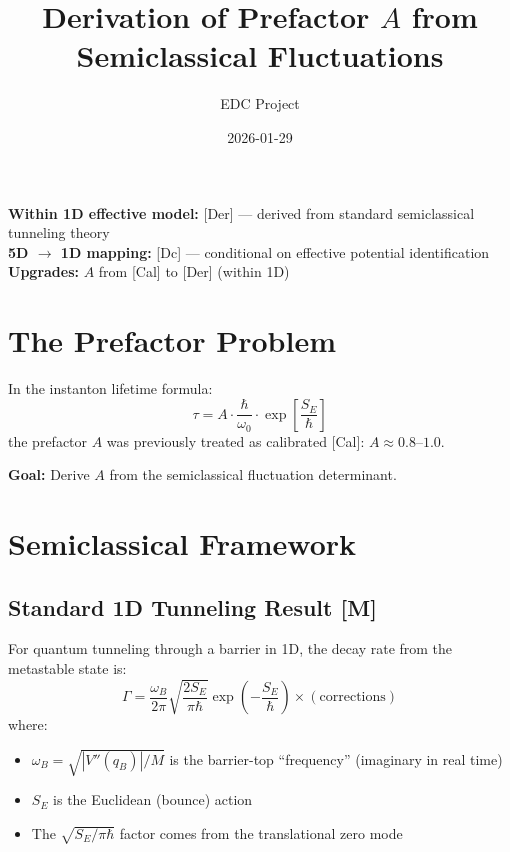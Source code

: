 \documentclass[11pt]{article}
\title{Derivation of Prefactor $A$ from Semiclassical Fluctuations}
\author{EDC Project}
\date{2026-01-29}
\newcommand{\tagDer}{{\small\textsf{[Der]}}}
\newcommand{\tagDc}{{\small\textsf{[Dc]}}}
\newcommand{\tagCal}{{\small\textsf{[Cal]}}}
\newcommand{\tagM}{{\small\textsf{[M]}}}
\begin{document}
\maketitle

\begin{tcolorbox}[colback=blue!5!white, colframe=blue!75!black, title=Epistemic Status]
\textbf{Within 1D effective model:} \tagDer{} --- derived from standard semiclassical tunneling theory \\
\textbf{5D $\to$ 1D mapping:} \tagDc{} --- conditional on effective potential identification \\
\textbf{Upgrades:} $A$ from \tagCal{} to \tagDer{} (within 1D)
\end{tcolorbox}

\section{The Prefactor Problem}

In the instanton lifetime formula:
\begin{equation}
    \tau = A \cdot \frac{\hbar}{\omega_0} \cdot \exp\left[\frac{S_E}{\hbar}\right]
    \label{eq:tau-formula}
\end{equation}
the prefactor $A$ was previously treated as calibrated \tagCal{}: $A \approx 0.8$--$1.0$.

\textbf{Goal:} Derive $A$ from the semiclassical fluctuation determinant.

\section{Semiclassical Framework}

\subsection{Standard 1D Tunneling Result \tagM{}}

For quantum tunneling through a barrier in 1D, the decay rate from the metastable state is:
\begin{equation}
    \Gamma = \frac{\omega_B}{2\pi} \sqrt{\frac{2S_E}{\pi\hbar}} \exp\left(-\frac{S_E}{\hbar}\right) \times (\text{corrections})
    \label{eq:Gamma-semiclassical}
\end{equation}
where:
\begin{itemize}
    \item $\omega_B = \sqrt{|V''(q_B)|/M}$ is the barrier-top ``frequency'' (imaginary in real time)
    \item $S_E$ is the Euclidean (bounce) action
    \item The $\sqrt{S_E/\pi\hbar}$ factor comes from the translational zero mode
\end{itemize}
\end{document}
